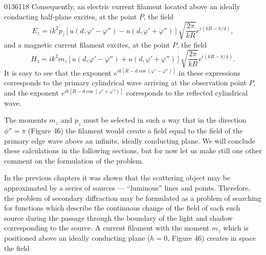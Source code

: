 \begin{scanpage}{0136}{118}
Consequently, an electric current filament located above an ideally conducting half-plane excites, at the point $P$, the field
\[E_z=ik^2p_z[u(d,\varphi'-\varphi'')-u(d,\varphi'+\varphi'')]\sqrt{\frac{2\pi}{kR}}e^{i(kR-\pi/4)},\tag{20.11}\]
and a magnetic current filament excites, at the point $P$, the field
\[H_z=ik^2m_z[u(d,\varphi'-\varphi'')+u(d,\varphi'+\varphi'')]\sqrt{\frac{2\pi}{kR}}e^{i(kR-\pi/4)}.\tag{20.12}\]
It is easy to see that the exponent $e^{ik[R-d\cos(\varphi'-\varphi'')]}$ in these expressions corresponds to the primary cylindrical wave arriving at the observation point $P$, and the exponent $e^{ik[R-d\cos(\varphi'+\varphi'')]}$ corresponds to the reflected cylindrical wave.

The moments $m_z$ and $p_z$ must be selected in such a way that in the direction $\phi''=\pi$ (Figure 46) the filament would create a field equal to the field of the primary edge wave above an infinite, ideally conducting plane. We will conclude these calculations in the following sections, but for now let us make still one other comment on the formulation of the problem.

In the previous chapters it was shown that the scattering object may be approximated by a series of sources --- ``luminous'' lines and points. Therefore, the problem of secondary diffraction may be formulated as a problem of searching for functions which describe the continuous change of the field of each such source during the passage through the boundary of the light and shadow corresponding to the source.
A current filament with the moment $m_z$ which is positioned above an ideally conducting plane ($h=0$, Figure 46) creates in space the field
\end{scanpage}
